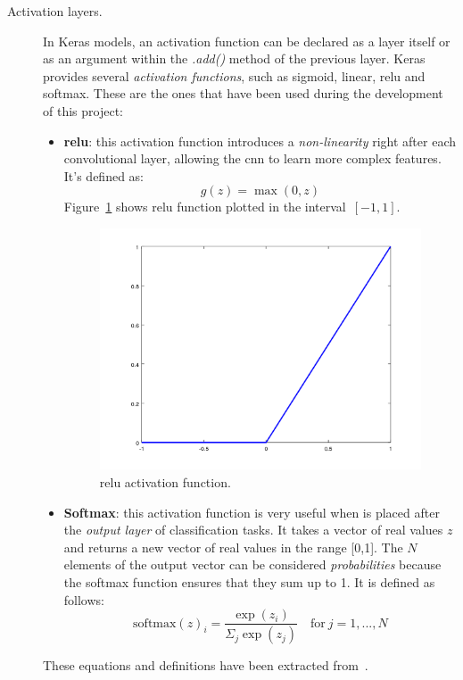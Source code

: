 \begin{description}
	\item[Activation layers.] In Keras models, an activation function can be declared as a layer itself or as an argument within the \textit{.add()} method of the previous layer. Keras provides several \emph{activation functions}, such as sigmoid, linear, \gls{relu} and softmax. These are the ones that have been used during the development of this project:
	\begin{itemize}
		\item \textbf{\gls{relu}}: this activation function introduces a \emph{non-linearity} right after each convolutional layer, allowing the \gls{cnn} to learn more complex features. It's defined as:
		\begin{equation}\label{eq:relu}
		g(z)=\max(0,z)
		\end{equation}
		Figure~\ref{fig:activations} shows \gls{relu} function plotted in the interval~$[-1,1]$.
		\begin{figure}
			\centering
			\includegraphics[width=0.6\linewidth]{figures/relu.png}
			\caption{\gls{relu} activation function.}
			\label{fig:activations}
		\end{figure}
		
		\item \textbf{Softmax}: this activation function is very useful when is placed after the \emph{output layer} of classification tasks. It takes a vector of real values $z$ and returns a new vector of real values in the range [0,1]. The $N$ elements of the output vector can be considered \emph{probabilities} because the softmax function ensures that they sum up to 1. It is defined as follows:
		\begin{equation}\label{eq:SoftMax}
		\mathrm{softmax}(z)_i=\frac{\exp(z_i)}{\Sigma_{j}{\exp(z_j)}} \quad \mathrm{for} \ j=1, ...,N
		\end{equation}
	\end{itemize}
	These equations and definitions have been extracted from~\cite{Goodfellow-et-al-2016}. 
	
\end{description}

